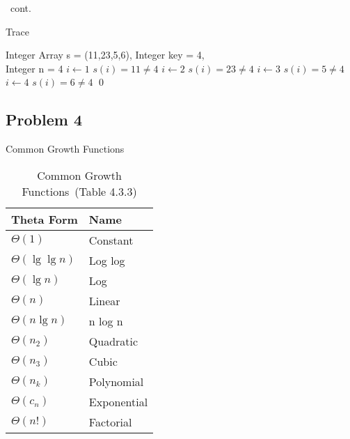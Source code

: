 \documentclass[handout]{beamer}
\begin{document}
        \begin{frame}[c,shrink]{\subsecname\ cont.}          
            \begin{algorithm}[H]
                \caption {Trace}
                \label{alg3}
                \begin{algorithmic}[1]
                    \REQUIRE Integer Array s = (11,23,5,6), Integer key = 4,\\ Integer n = 4
                    \STATE $i \leftarrow 1$
                    \STATE $s(i) = 11 \neq 4$
                    \STATE $i \leftarrow 2$
                    \STATE $s(i) = 23 \neq 4$
                    \STATE $i \leftarrow 3$
                    \STATE $s(i) = 5 \neq 4$
                    \STATE $i \leftarrow 4$
                    \STATE $s(i) = 6 \neq 4$
                     \qed
                \end{algorithmic}                
            \end{algorithm}        
        \end{frame}




    \subsection{Problem 4}
    
        \begin{frame}[c,shrink]{Common Growth Functions}
            \begin{table}[tp]%
                \caption{Common Growth Functions\ (Table 4.3.3)}
                \label{cgf}\centering%
                \begin{tabular}{ll}
                    \hline%
                    Theta Form             & Name         \\\hline%
                    $\Theta(1)         $   & Constant     \\
                    $\Theta(\lg\lg{n}) $   & Log log      \\
                    $\Theta(\lg{n})    $   & Log          \\
                    $\Theta(n)         $   & Linear       \\
                    $\Theta(n\lg{n})   $   & n log n      \\
                    $\Theta(n_2)       $   & Quadratic    \\
                    $\Theta(n_3)       $   & Cubic        \\
                    $\Theta(n_k)       $   & Polynomial   \\
                    $\Theta(c_n)       $   & Exponential  \\
                    $\Theta(n!)        $   & Factorial    \\\hline%
                \end{tabular}
            \end{table}
        \end{frame}
    
\end{document}
